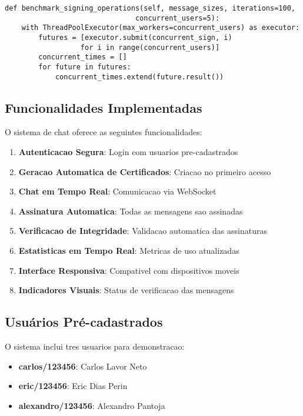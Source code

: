\documentclass[12pt,a4paper,oneside]{article}
\begin{document}
\begin{lstlisting}[caption=Benchmark de operações concorrentes]
def benchmark_signing_operations(self, message_sizes, iterations=100, 
                               concurrent_users=5):
    with ThreadPoolExecutor(max_workers=concurrent_users) as executor:
        futures = [executor.submit(concurrent_sign, i) 
                  for i in range(concurrent_users)]
        concurrent_times = []
        for future in futures:
            concurrent_times.extend(future.result())
\end{lstlisting}

\subsection{Funcionalidades Implementadas}

O sistema de chat oferece as seguintes funcionalidades:

\begin{enumerate}
    \item \textbf{Autenticacao Segura}: Login com usuarios pre-cadastrados
    \item \textbf{Geracao Automatica de Certificados}: Criacao no primeiro acesso
    \item \textbf{Chat em Tempo Real}: Comunicacao via WebSocket
    \item \textbf{Assinatura Automatica}: Todas as mensagens sao assinadas
    \item \textbf{Verificacao de Integridade}: Validacao automatica das assinaturas
    \item \textbf{Estatisticas em Tempo Real}: Metricas de uso atualizadas
    \item \textbf{Interface Responsiva}: Compativel com dispositivos moveis
    \item \textbf{Indicadores Visuais}: Status de verificacao das mensagens
\end{enumerate}

\subsection{Usuários Pré-cadastrados}

O sistema inclui tres usuarios para demonstracao:

\begin{itemize}
    \item \textbf{carlos/123456}: Carlos Lavor Neto
    \item \textbf{eric/123456}: Eric Dias Perin
    \item \textbf{alexandro/123456}: Alexandro Pantoja
\end{itemize}
\end{document}
